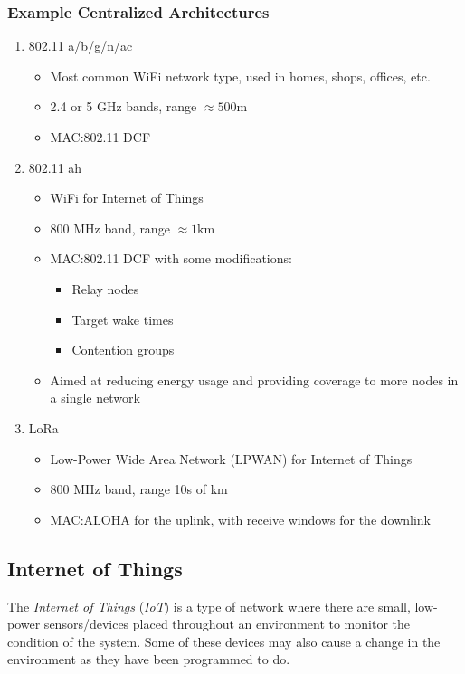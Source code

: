 \subsubsection{Example Centralized Architectures}\label{subsubsec:Centralized_Architectures}
\begin{enumerate}[noitemsep]
\item 802.11 a/b/g/n/ac
\begin{itemize}[noitemsep]
\item Most common WiFi network type, used in homes, shops, offices, etc.
\item 2.4 or 5 GHz bands, range $\approx 500 \si{\meter}$
\item MAC:\@ 802.11 DCF
\end{itemize}

\item 802.11 ah
  \begin{itemize}[noitemsep]
  \item WiFi for Internet of Things
  \item 800 MHz band, range $\approx 1 \si{\kilo \meter}$
  \item MAC:\@ 802.11 DCF with some modifications:
    \begin{itemize}[noitemsep]
    \item Relay nodes
    \item Target wake times
    \item Contention groups
    \end{itemize}
  \item Aimed at reducing energy usage and providing coverage to more nodes in a single network
\end{itemize}

\item LoRa
  \begin{itemize}[noitemsep]
  \item Low-Power Wide Area Network (LPWAN) for Internet of Things
  \item 800 MHz band, range 10s of km
  \item MAC:\@ ALOHA for the uplink, with receive windows for the downlink
  \end{itemize}
\end{enumerate}

\subsection{Internet of Things}\label{subsec:IoT}
\begin{definition}\label{def:IoT}
  The \emph{Internet of Things} (\emph{IoT}) is a type of network where there are small, low-power sensors/devices placed throughout an environment to monitor the condition of the system.
  Some of these devices may also cause a change in the environment as they have been programmed to do.
\end{definition}

